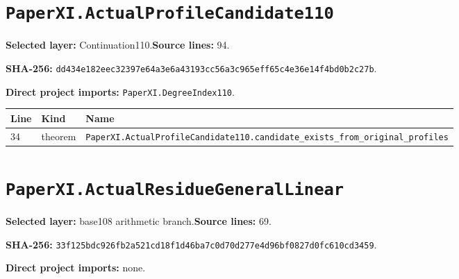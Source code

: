 \documentclass[10pt,oneside]{book}
\begin{document}
\section{\texorpdfstring{\nolinkurl{PaperXI.ActualProfileCandidate110}}{PaperXI.ActualProfileCandidate110}}\label{module:PaperXI.ActualProfileCandidate110}

\textbf{Selected layer:} Continuation110.\quad\textbf{Source lines:} 94.\par\textbf{SHA-256:} {\scriptsize\nolinkurl{dd434e182eec32397e64a3e6a43193cc56a3c965eff65c4e36e14f4bd0b2c27b}}.


\textbf{Direct project imports:} \nolinkurl{PaperXI.DegreeIndex110}.

\begin{longtable}{@{}p{}p{}p{}@{}}\toprule Line&Kind&Name\\\midrule\endhead

34&theorem&\nolinkurl{PaperXI.ActualProfileCandidate110.candidate_exists_from_original_profiles}\\

\bottomrule\end{longtable}

\section{\texorpdfstring{\nolinkurl{PaperXI.ActualResidueGeneralLinear}}{PaperXI.ActualResidueGeneralLinear}}\label{module:PaperXI.ActualResidueGeneralLinear}

\textbf{Selected layer:} base108 arithmetic branch.\quad\textbf{Source lines:} 69.\par\textbf{SHA-256:} {\scriptsize\nolinkurl{33f125bdc926fb2a521cd18f1d46ba7c0d70d277e4d96bf0827d0fc610cd3459}}.


\textbf{Direct project imports:} none.
\end{document}
